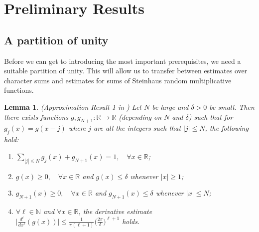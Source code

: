 \documentclass[reqno]{amsart}
\newtheorem{lemma}{Lemma}
\theoremstyle{definition}
\theoremstyle{remark}
\numberwithin{equation}{section}
\theoremstyle{remark}
\begin{document}
\section{Preliminary Results} \label{sec2}
\subsection{A partition of unity}
Before we can get to introducing the most important prerequisites, we need a suitable partition of unity. This will allow us to transfer between estimates over character sums and estimates for sums of Steinhaus random multiplicative functions.
\begin{lemma}
    (Approximation Result 1 in \cite{harper2023typicalsizecharacterzeta}) Let $N$ be large and $\delta>0$ be small. Then there exists functions $g,g_{N+1}:\mathbb{R} \to \mathbb{R}$ (depending on $N$ and $\delta$) such that for $g_j(x) = g(x-j)$ where $j$ are all the integers such that $|j| \leq N$, the following hold:
    \begin{enumerate}
        \item $\sum_{|j| \leq N}g_j(x) + g_{N+1}(x) = 1, \quad \forall x \in \mathbb{R}$;
        \item $g(x) \geq 0, \quad \forall x \in \mathbb{R}$ and $g(x) \leq \delta$ whenever $|x| \geq 1$;
        \item $g_{N+1}(x) \geq 0, \quad \forall x \in \mathbb{R}$ and $g_{N+1}(x) \leq \delta$ whenever $|x| \leq N$;
        \item $\forall \ell \in \mathbb{N}$ and $\forall x \in \mathbb{R}$, the derivative estimate $\big|\frac{d^{\ell}}{dx^{\ell}}(g(x))\big| \leq \frac{1}{\pi(\ell+1)}\bigg(\frac{2\pi}{\delta}\bigg)^{\ell+1}$ holds.
    \end{enumerate}
    \label{partition_result}
\end{lemma}
\end{document}
